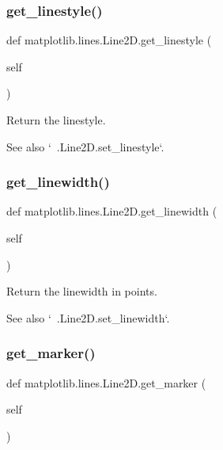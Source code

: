 \subsubsection{\texorpdfstring{get\+\_\+linestyle()}{get\_linestyle()}}
{\footnotesize\ttfamily def matplotlib.\+lines.\+Line2\+D.\+get\+\_\+linestyle (\begin{DoxyParamCaption}\item[{}]{self }\end{DoxyParamCaption})}

\begin{DoxyVerb}Return the linestyle.

See also `~.Line2D.set_linestyle`.
\end{DoxyVerb}
 \mbox{\label{classmatplotlib_1_1lines_1_1Line2D_af33bf3fa2eec1a81d08ce1417f38a17d}} 
\subsubsection{\texorpdfstring{get\+\_\+linewidth()}{get\_linewidth()}}
{\footnotesize\ttfamily def matplotlib.\+lines.\+Line2\+D.\+get\+\_\+linewidth (\begin{DoxyParamCaption}\item[{}]{self }\end{DoxyParamCaption})}

\begin{DoxyVerb}Return the linewidth in points.

See also `~.Line2D.set_linewidth`.
\end{DoxyVerb}
 \mbox{\label{classmatplotlib_1_1lines_1_1Line2D_a43ec184416db444f0821f92867c4af33}} 
\subsubsection{\texorpdfstring{get\+\_\+marker()}{get\_marker()}}
{\footnotesize\ttfamily def matplotlib.\+lines.\+Line2\+D.\+get\+\_\+marker (\begin{DoxyParamCaption}\item[{}]{self }\end{DoxyParamCaption})}

